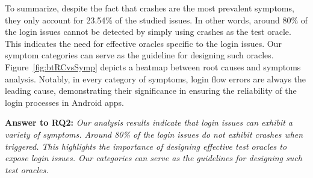 To summarize, despite the fact that crashes are the most prevalent symptoms, they only account for 23.54\% of the studied issues. In other words, around 80\% of the login issues cannot be detected by simply using crashes as the test oracle.
This indicates the need for effective oracles specific to the login issues.
Our symptom categories can serve as the guideline for designing such oracles.
Figure~\ref{fig:btRCvsSymp} depicts a heatmap between root causes and symptoms analysis.
Notably, in every category of symptoms, login flow errors are always the leading cause, demonstrating their significance in ensuring the reliability of the login processes in Android apps. 



\begin{tcolorbox}[left=3pt,right=3pt,top=1pt,bottom=1pt]
    \textbf{Answer to RQ2:} 
\textit{
Our analysis results indicate that login issues can exhibit a variety of symptoms.
Around 80\% of the login issues do not exhibit crashes when triggered. This highlights the importance of designing effective test oracles to expose login issues. Our categories can serve as the guidelines for designing such test oracles.
}
\end{tcolorbox}